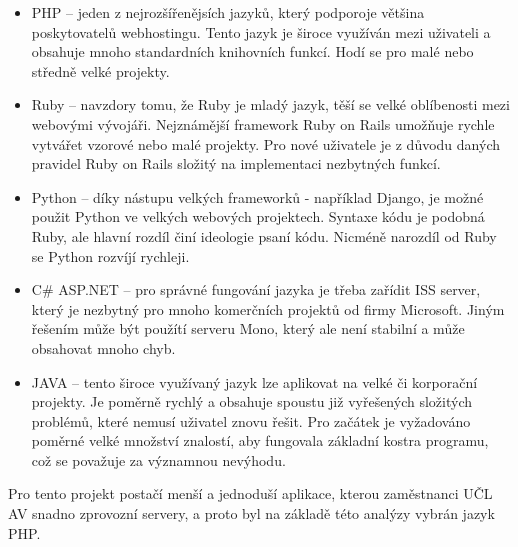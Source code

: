             \begin{itemize}
                \item PHP – jeden z nejrozšířenějsích jazyků, který podporoje většina poskytovatelů webhostingu. Tento jazyk je široce využíván mezi uživateli a obsahuje mnoho standardních knihovních funkcí. Hodí se pro malé nebo středně velké projekty.
                
                \item Ruby – navzdory tomu, že Ruby je mladý jazyk, těší se velké oblíbenosti mezi webovými vývojáři. Nejznámější framework Ruby on Rails umožňuje rychle vytvářet vzorové nebo malé projekty. Pro nové uživatele je z důvodu daných pravidel Ruby on Rails složitý na implementaci nezbytných funkcí.
                
                \item Python – díky nástupu velkých frameworků - například Django, je možné použit Python ve velkých webových projektech. Syntaxe kódu je podobná Ruby, ale hlavní rozdíl činí ideologie psaní kódu. Nicméně narozdíl od Ruby se Python rozvíjí rychleji.
                
                \item C\# ASP.NET – pro správné fungování jazyka je třeba zařídit ISS server, který je nezbytný pro mnoho komerčních projektů od firmy Microsoft. Jiným řešením může být použítí serveru Mono, který ale není stabilní a může obsahovat mnoho chyb.
                
                \item JAVA – tento široce využívaný jazyk lze aplikovat na velké či korporační projekty. Je poměrně rychlý a obsahuje spoustu již vyřešených složitých problémů, které nemusí uživatel znovu řešit. Pro začátek je vyžadováno poměrné velké množství znalostí, aby fungovala základní kostra programu, což se považuje za významnou nevýhodu.
            \end{itemize}
            
            Pro tento projekt postačí menší a jednoduší aplikace, kterou zaměstnanci UČL AV snadno zprovozní servery, a proto byl na základě této analýzy vybrán jazyk PHP.
            
